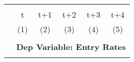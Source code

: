 \begin{tabular}{lccccc} \hline
    \vspace{-2pt} & \vspace{-2pt} & \vspace{-2pt} & \vspace{-2pt} & \vspace{-2pt} \\
     & t & t+1 & t+2 & t+3 & t+4 \\ 
     & (1) & (2) & (3) & (4) & (5) \\
    \hline 
   
    \vspace{-1.5pt} & \vspace{-1.5pt} & \vspace{-1.5pt} & \vspace{-1.5pt} & \vspace{-1.5pt} \\
    &\multicolumn{5}{c}{\textbf{Dep Variable: Entry Rates}} \\ 
    \vspace{-1.5pt} & \vspace{-1.5pt} & \vspace{-1.5pt} & \vspace{-1.5pt} & \vspace{-1.5pt} \\
    \cmidrule{2-6}
    

\end{tabular}
